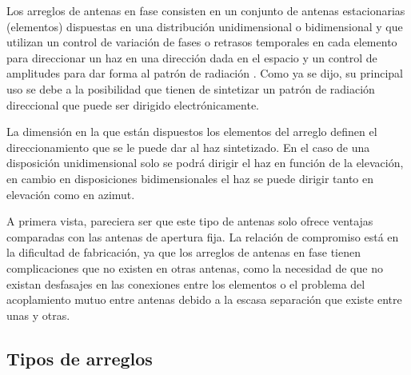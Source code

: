 Los arreglos de antenas en fase consisten en un conjunto de antenas estacionarias (elementos) dispuestas en una distribución unidimensional o bidimensional y que utilizan un control de variación de fases o retrasos temporales en cada elemento para direccionar un haz en una dirección dada en el espacio y un control de amplitudes para dar forma al patrón de radiación \cite{bib:phahandbook_ch1}. Como ya se dijo, su principal uso se debe a la posibilidad que tienen de sintetizar un patrón de radiación direccional que puede ser dirigido electrónicamente.

La dimensión en la que están dispuestos los elementos del arreglo definen el direccionamiento que se le puede dar al haz sintetizado. En el caso de una disposición unidimensional solo se podrá dirigir el haz en función de la elevación, en cambio en disposiciones bidimensionales el haz se puede dirigir tanto en elevación como en azimut.

A primera vista, pareciera ser que este tipo de antenas solo ofrece ventajas comparadas con las antenas de apertura fija. La relación de compromiso está en la dificultad de fabricación, ya que los arreglos de antenas en fase tienen complicaciones que no existen en otras antenas, como la necesidad de que no existan desfasajes en las conexiones entre los elementos o el problema del acoplamiento mutuo entre antenas debido a la escasa separación que existe entre unas y otras.

\subsection{Tipos de arreglos}\label{subc:beamforming_phasedarraystipos}

